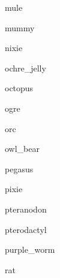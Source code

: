 \documentclass[letterpaper,serif]{module}
\begin{document}
\begin{newmonster}{mule}\end{newmonster}

\begin{newmonster}{mummy}\end{newmonster}

\begin{newmonster}{nixie}\end{newmonster}

\begin{newmonster}{ochre_jelly}\end{newmonster}

\begin{newmonster}{octopus}\end{newmonster}

\begin{newmonster}{ogre}\end{newmonster}

\begin{newmonster}{orc}\end{newmonster}

\begin{newmonster}{owl_bear}\end{newmonster}

\begin{newmonster}{pegasus}\end{newmonster}

\begin{newmonster}{pixie}\end{newmonster}

\begin{newmonster}{pteranodon}\end{newmonster}

\begin{newmonster}{pterodactyl}\end{newmonster}

\begin{newmonster}{purple_worm}\end{newmonster}

\begin{newmonster}{rat}\end{newmonster}
\end{document}
